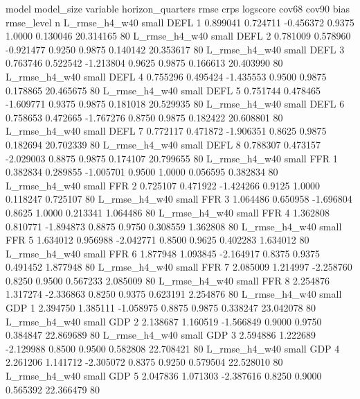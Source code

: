          model model_size variable  horizon_quarters     rmse     crps  logscore  cov68  cov90      bias  rmse_level  n
 L_rmse_h4_w40      small     DEFL                 1 0.899041 0.724711 -0.456372 0.9375 1.0000  0.130046   20.314165 80
 L_rmse_h4_w40      small     DEFL                 2 0.781009 0.578960 -0.921477 0.9250 0.9875  0.140142   20.353617 80
 L_rmse_h4_w40      small     DEFL                 3 0.763746 0.522542 -1.213804 0.9625 0.9875  0.166613   20.403990 80
 L_rmse_h4_w40      small     DEFL                 4 0.755296 0.495424 -1.435553 0.9500 0.9875  0.178865   20.465675 80
 L_rmse_h4_w40      small     DEFL                 5 0.751744 0.478465 -1.609771 0.9375 0.9875  0.181018   20.529935 80
 L_rmse_h4_w40      small     DEFL                 6 0.758653 0.472665 -1.767276 0.8750 0.9875  0.182422   20.608801 80
 L_rmse_h4_w40      small     DEFL                 7 0.772117 0.471872 -1.906351 0.8625 0.9875  0.182694   20.702339 80
 L_rmse_h4_w40      small     DEFL                 8 0.788307 0.473157 -2.029003 0.8875 0.9875  0.174107   20.799655 80
 L_rmse_h4_w40      small      FFR                 1 0.382834 0.289855 -1.005701 0.9500 1.0000  0.056595    0.382834 80
 L_rmse_h4_w40      small      FFR                 2 0.725107 0.471922 -1.424266 0.9125 1.0000  0.118247    0.725107 80
 L_rmse_h4_w40      small      FFR                 3 1.064486 0.650958 -1.696804 0.8625 1.0000  0.213341    1.064486 80
 L_rmse_h4_w40      small      FFR                 4 1.362808 0.810771 -1.894873 0.8875 0.9750  0.308559    1.362808 80
 L_rmse_h4_w40      small      FFR                 5 1.634012 0.956988 -2.042771 0.8500 0.9625  0.402283    1.634012 80
 L_rmse_h4_w40      small      FFR                 6 1.877948 1.093845 -2.164917 0.8375 0.9375  0.491452    1.877948 80
 L_rmse_h4_w40      small      FFR                 7 2.085009 1.214997 -2.258760 0.8250 0.9500  0.567233    2.085009 80
 L_rmse_h4_w40      small      FFR                 8 2.254876 1.317274 -2.336863 0.8250 0.9375  0.623191    2.254876 80
 L_rmse_h4_w40      small      GDP                 1 2.394750 1.385111 -1.058975 0.8875 0.9875  0.338247   23.042078 80
 L_rmse_h4_w40      small      GDP                 2 2.138687 1.160519 -1.566849 0.9000 0.9750  0.384847   22.869689 80
 L_rmse_h4_w40      small      GDP                 3 2.594886 1.222689 -2.129988 0.8500 0.9500  0.582808   22.708421 80
 L_rmse_h4_w40      small      GDP                 4 2.261206 1.141712 -2.305072 0.8375 0.9250  0.579504   22.528010 80
 L_rmse_h4_w40      small      GDP                 5 2.047836 1.071303 -2.387616 0.8250 0.9000  0.565392   22.366479 80
